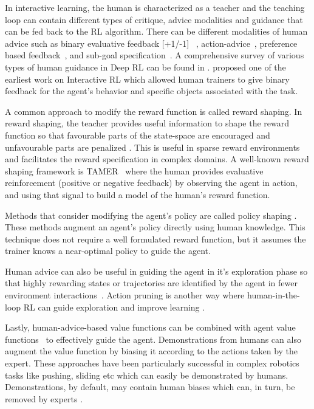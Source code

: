 \documentclass[twoside,11pt]{article}
\begin{document}
In interactive learning, the human is characterized as a teacher and the teaching loop can contain different types of critique, advice modalities and guidance that can be fed back to the RL algorithm. There can be different modalities of human advice such as binary evaluative feedback [+1/-1] ~\citep{Knox:2008:TAMER}, action-advice~\citep{torrey2013teaching}, preference based feedback~\citep{Christiano:2017:DeepRLHumanPreferences,LeeSmithAbbeel:2021:FeedbackPreferenceHITLLearningPEBBLE}, and sub-goal specification~\citep{le2018hierarchical}. A comprehensive survey of various types of human guidance in Deep RL can be found in \citet{zhang2019leveraging}. \citet{Thomaz:2006:RLWithHumanTeachers} proposed one of the earliest work on Interactive RL which allowed human trainers to give binary feedback for the agent's behavior and specific objects associated with the task.

A common approach to modify the reward function is called reward shaping. In reward shaping, the teacher provides useful information to shape the reward function so that favourable parts of the state-space are encouraged and unfavourable parts are penalized \citep{ng:99}. This is useful in sparse reward environments and facilitates the reward specification in complex domains. A well-known reward shaping framework is TAMER~\citep{Knox:2008:TAMER, knox:13} where the human provides evaluative reinforcement (positive or negative feedback) by observing the agent in action, and using that signal to build a model of the human's reward function. 

Methods that consider modifying the agent's policy are called policy shaping \citep{cederborg2015policy,griffith2013policy,WuEtAl:2021:HITLDRLAutonomousDriving}. These methods augment an agent's policy directly using human knowledge. This technique does not require a well formulated reward function, but it assumes the trainer knows a near-optimal policy to guide the agent. 

Human advice can also be useful in guiding the agent in it’s exploration phase so that highly rewarding states or trajectories are identified by the agent in fewer environment interactions~\citep{amir2016interactive}. Action pruning is another way where human-in-the-loop RL can guide exploration and improve learning \citep{Abel:2017:AgentAgnosticHumanInTheLoopRL}.

Lastly, human-advice-based value functions can be combined with agent value functions~\citep{jiang:21,kartoun:10, taylor2011integrating, WuEtAl:2021:HITLDRLAutonomousDriving} to effectively guide the agent. Demonstrations \citep{hester2018deep,vecerik2017leveraging,nair2018overcoming} from humans can also augment the value function by biasing it according to the  actions taken by the expert. These approaches have been particularly successful in complex robotics tasks like pushing, sliding etc which can easily be demonstrated by humans.  Demonstrations, by default, may contain human biases which can, in turn, be removed by experts \citep{Wang:2022:SkillPreferences}.
\end{document}
